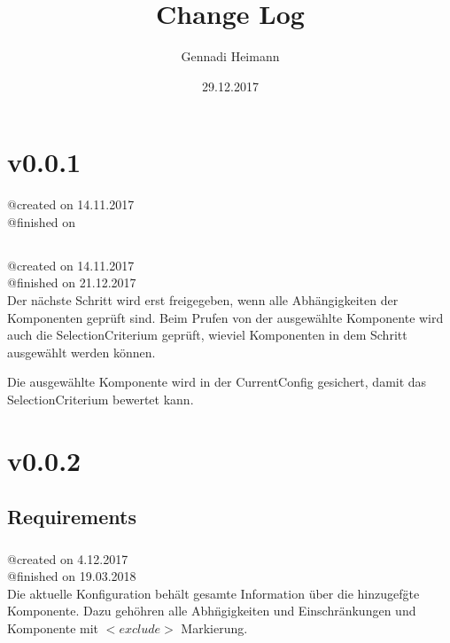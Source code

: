 \documentclass{article}
\begin{document}
\begin{titlepage}
\author{Gennadi Heimann} 
\title{Change Log} 
\date{29.12.2017} 
\maketitle
\end{titlepage}

\section{v0.0.1}
@created on 14.11.2017\\
@finished on \\

\subsection{}
@created on     14.11.2017\\
@finished on   21.12.2017\\

Der n\"achste Schritt wird erst freigegeben, wenn alle Abh\"angigkeiten 
der Komponenten gepr\"uft sind. Beim Prufen von der ausgew\"ahlte 
Komponente wird auch die SelectionCriterium gepr\"uft, wieviel Komponenten 
in dem Schritt ausgew\"ahlt werden k\"onnen.

Die ausgew\"ahlte Komponente wird in der CurrentConfig gesichert, damit das
SelectionCriterium bewertet kann.\\

\section{v0.0.2}

\subsection{Requirements}

\subsubsection{}
@created on     4.12.2017\\
@finished on   19.03.2018\\

Die aktuelle Konfiguration beh\"alt gesamte Information \"uber die hinzugef\"gte
Komponente. Dazu geh\"ohren alle Abh\"ngigkeiten und Einschr\"ankungen und
Komponente mit $<exclude>$ Markierung.\\
\end{document}
